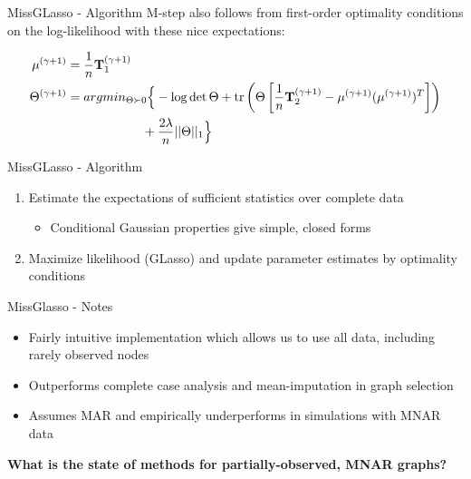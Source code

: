 \documentclass{beamer}
\begin{document}
\begin{frame}{MissGLasso - Algorithm}
M-step also follows from first-order optimality conditions on the log-likelihood with these nice expectations:

\begin{align*}
    \mu^{(\gamma+1)}
    &=
    \frac{1}{n}\mathbf{T}_1^{(\gamma+1)}
    \\
    \Theta^{(\gamma + 1)}
    &=
    argmin_{\Theta \succ 0}
    \Big\{
    -\log \det \Theta 
    +
    \text{tr}
    \left(
        \Theta 
        \left[ 
            \frac{1}{n}\mathbf{T}_2^{(\gamma + 1)}
            -
            \mu^{(\gamma + 1)}
            (\mu^{(\gamma + 1)})^T
        \right]
    \right)
    \\
    &\hspace{21mm}
    +
    \frac{2\lambda}{n}||\Theta||_1 \Big\}
\end{align*}

\end{frame}

\begin{frame}{MissGLasso - Algorithm}
    \bf{
\begin{enumerate}
    \item {\Large E}stimate the expectations of sufficient statistics over complete data
    \begin{itemize}
        \item Conditional Gaussian properties give simple, closed forms 
    \end{itemize}
    \item {\Large M}aximize likelihood (GLasso) and update parameter estimates by optimality conditions 
\end{enumerate}
    }
\end{frame}

\begin{frame}{MissGlasso - Notes}
    \begin{itemize}
        \item Fairly intuitive implementation which allows us to use all data, including rarely observed nodes 
        \item Outperforms complete case analysis and mean-imputation in graph selection 
        \item Assumes MAR and empirically underperforms in simulations with MNAR data 
    \end{itemize}
\end{frame}

\begin{frame}{}
    \bf{\Large What is the state of methods for partially-observed, MNAR graphs?}
\end{frame}
\end{document}
